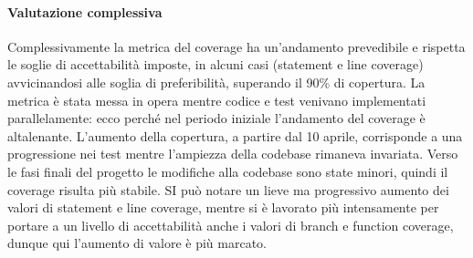 \paragraph*{Valutazione complessiva}
Complessivamente la metrica del coverage ha un'andamento prevedibile e rispetta le soglie di accettabilità imposte, in alcuni casi (statement e line coverage) avvicinandosi alle soglia di preferibilità, superando il 90\% di copertura.
La metrica è stata messa in opera mentre codice e test venivano implementati parallelamente: ecco perché nel periodo iniziale l'andamento del coverage è altalenante.
L'aumento della copertura, a partire dal 10 aprile, corrisponde a una progressione nei test mentre l'ampiezza della codebase rimaneva invariata.
Verso le fasi finali del progetto le modifiche alla codebase sono state minori, quindi il coverage risulta più stabile. SI può notare  un lieve ma progressivo aumento dei valori di statement e line coverage, mentre si è lavorato più intensamente per portare a un livello di accettabilità anche i valori di branch e function coverage, dunque qui l'aumento di valore è più marcato.


